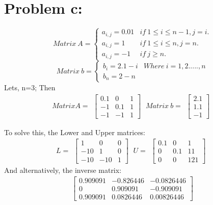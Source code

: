 \documentclass[a4paper, 10pt]{article}
\begin{document}
\section{Problem c:}
\[ Matrix \ A =
  \begin{cases}
   	a_{i,j}=0.01 & if \ 1\leq i \leq n-1, j=i.\\
   	a_{i,j}=1 & if \ 1\leq i \leq n, j=n.\\
   	a_{i,j}=-1 & if \ j\geq n.
  \end{cases}
\]
\[ Matrix \ b =
  \begin{cases}
   	b_i=2.1-i & Where \ i=1,2.....,n\\
   	b_n=2-n
  \end{cases}
\]
Lets, n=3; Then\\
\begin{equation*}
Matrix A =
\begin{matrix}
	\begin{bmatrix}
	0.1 &	0 &	1\\	
	-1 &	0.1 &	1\\	
	-1 &	-1 &	1	 
	\end{bmatrix}
\end{matrix}
\ Matrix \ b =
\begin{matrix}
	\begin{bmatrix}
	2.1\\1.1\\-1
	\end{bmatrix}
\end{matrix}
\end{equation*}

\noindent To solve this, the Lower and Upper matrices:
\begin{equation*}
L =
\begin{matrix}
	\begin{bmatrix}
	1 &	0 &	0\\	
	-10 &	1 &	0\\	
	-10 &	-10 &	1
	\end{bmatrix}
\end{matrix}
\ U =
\begin{matrix}
	\begin{bmatrix}
	0.1	& 0 &	1\\	
	0 &	0.1 &	11\\	
	0 &	0 &	121	
	\end{bmatrix}
\end{matrix}
\end{equation*}
And alternatively, the inverse matrix:
\begin{equation*}
\begin{matrix}
	\begin{bmatrix}
0.909091 &	-0.826446 &	-0.0826446\\	
0 &	0.909091 &	-0.909091\\	
0.909091 &	0.0826446 &	0.00826446	
	\end{bmatrix}
\end{matrix}
\end{equation*}
\end{document}
